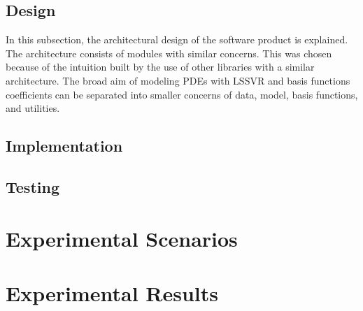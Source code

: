 \subsection{Design}
\noindent In this subsection, the architectural design of the software product is explained. The architecture consists of modules with similar concerns. This was chosen because of the intuition built by the use of other libraries with a similar architecture. The broad aim of modeling PDEs with LSSVR and basis functions coefficients can be separated into smaller concerns of data, model, basis functions, and utilities. 


\subsection{Implementation}

\subsection{Testing}

\section{Experimental Scenarios}
\noindent

\section{Experimental Results}
\noindent



